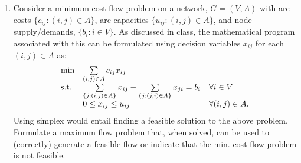 \documentclass[10pt]{article}
\begin{document}
\begin{enumerate}
  \item Consider a minimum cost flow problem on a network, $G = (V,A)$ with arc costs $\{c_{ij} : (i,j) \in A\}$,
    arc capacities $\{u_{ij} : (i,j) \in A\}$, and node supply/demands, $\{b_i : i \in V\}$. As discussed in class, 
    the mathematical program associated with this can be formulated using decision variables $x_{ij}$ for each $(i,j) \in A$ as:
    \[
    \begin{array}{lll}
      \min & \sum\limits_{(i,j) \in A} c_{ij} x_{ij} & \\
      \mbox{s.t.} & \sum\limits_{\{j : (i,j) \in A\}} x_{ij} - \sum\limits_{\{j : (j,i) \in A\}} x_{ji} = b_i & \forall i \in V \\[2mm]
      & 0 \leq x_{ij} \leq u_{ij} & \forall (i,j) \in A.
    \end{array}
    \]
    Using simplex would entail finding a feasible solution to the
    above problem. Formulate a maximum flow problem that, when solved,
    can be used to (correctly) generate a feasible flow or indicate
    that the min. cost flow problem is not feasible.


\end{enumerate}
\end{document}
